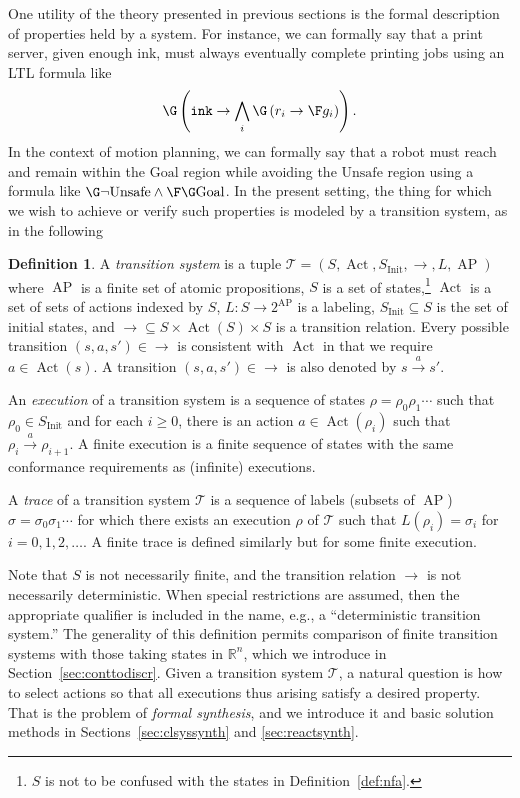 \documentclass{amsart}
\DeclareMathOperator{\Act}{Act}
\DeclareMathOperator{\ap}{AP}
\theoremstyle{plain}
\theoremstyle{definition}
\newtheorem{defn}{Definition}
\theoremstyle{definition}
\begin{document}
One utility of the theory presented in previous sections is the formal
description of properties held by a system.  For instance, we can formally say
that a print server, given enough ink, must always eventually complete printing
jobs using an LTL formula like
\[
\G\left(\mathtt{ink}\rightarrow \bigwedge_{i}\G\left( r_i \rightarrow \F g_i \right)\right) .
\]
In the context of motion planning, we can formally say that a robot must reach
and remain within the $\mathrm{Goal}$ region while avoiding the
$\mathrm{Unsafe}$ region using a formula like $\G \neg\mathrm{Unsafe} \wedge
\F\G \mathrm{Goal}$.  In the present setting, the thing for which we wish to
achieve or verify such properties is modeled by a transition system, as in the
following
\begin{defn}\label{def:ts}
A \textit{transition system} is a tuple $\mathcal{T} = (S,\Act, S_{\mathrm{Init}},
\longrightarrow, L, \ap)$ where $\ap$ is a finite set of atomic propositions, $S$
is a set of states,\footnote{$S$ is not to be confused with the states in
  Definition~\ref{def:nfa}.} $\Act$ is a set of sets of actions indexed by $S$,
$L:S\rightarrow 2^{\ap}$ is a labeling, $S_{\mathrm{Init}}\subseteq S$ is the
set of initial states, and $\longrightarrow\subseteq S\times\Act(S)\times S$ is
a transition relation.  Every possible transition $(s,a,s')\in \longrightarrow$
is consistent with $\Act$ in that we require $a\in\Act(s)$. A transition
$(s,a,s')\in\longrightarrow$ is also denoted by $s \overset{a}{\longrightarrow} s'$.

An \textit{execution} of a transition system is a sequence of states
$\rho=\rho_0 \rho_1 \cdots$ such that $\rho_0 \in S_{\mathrm{Init}}$ and for
each $i\geq 0$, there is an action $a\in\Act(\rho_i)$ such that $\rho_i
\overset{a}{\longrightarrow}\rho_{i+1}$.  A finite execution is a finite
sequence of states with the same conformance requirements as (infinite)
executions.

A \textit{trace} of a transition system $\mathcal{T}$ is a sequence of labels (subsets of
$\ap$) $\sigma=\sigma_0 \sigma_1 \cdots$ for which there exists an execution
$\rho$ of $\mathcal{T}$ such that $L(\rho_{i})=\sigma_{i}$ for $i=0,1,2,\ldots$.  A finite
trace is defined similarly but for some finite execution.
\end{defn}
Note that $S$ is not necessarily finite, and the transition relation
$\longrightarrow$ is not necessarily deterministic.  When special restrictions
are assumed, then the appropriate qualifier is included in the name, e.g., a
``deterministic transition system.''  The generality of this definition permits
comparison of finite transition systems with those taking states in
$\mathbb{R}^n$, which we introduce in Section~\ref{sec:conttodiscr}.  Given a
transition system $\mathcal{T}$, a natural question is how to select actions so that all
executions thus arising satisfy a desired property.  That is the problem of
\textit{formal synthesis}, and we introduce it and basic solution methods in
Sections~\ref{sec:clsyssynth} and \ref{sec:reactsynth}.
\end{document}
